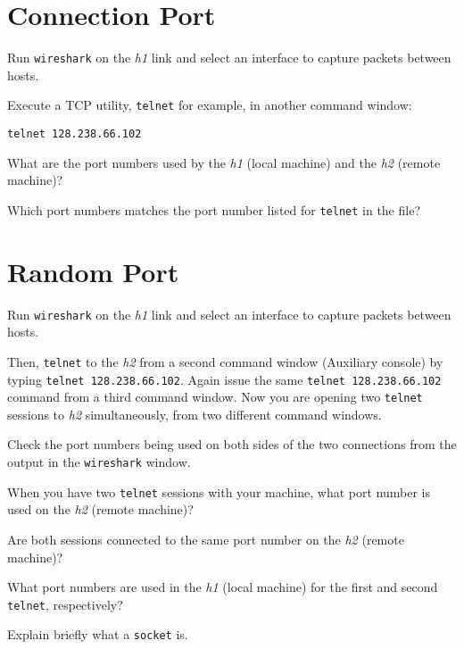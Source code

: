 \documentclass{../UTNetLab}
\begin{document}
\section{Connection Port}
    Run \lstinline{wireshark} on the \textit{h1} link and select an interface to capture packets between hosts.

    Execute a TCP utility, \lstinline{telnet} for example, in another command window:
    \begin{lstlisting}
telnet 128.238.66.102
    \end{lstlisting}
    
    \begin{report}
        \item What are the port numbers used by the \textit{h1} (local machine) and the \textit{h2} (remote machine)?

        \item Which port numbers matches the port number listed for \lstinline{telnet} in the  file?
    \end{report}

\section{Random Port}
    Run \lstinline{wireshark} on the \textit{h1} link and select an interface to capture packets between hosts.

    Then, \lstinline{telnet} to the \textit{h2} from a second command window (Auxiliary console) by typing \lstinline{telnet 128.238.66.102}.
    Again issue the same \lstinline{telnet 128.238.66.102} command from a third command window.
    Now you are opening two \lstinline{telnet} sessions to \textit{h2} simultaneously, from two different command windows.

    Check the port numbers being used on both sides of the two connections from the output in the \lstinline{wireshark} window.

    \begin{report}
        \item When you have two \lstinline{telnet} sessions with your machine, what port number is used on the \textit{h2} (remote machine)?

        \item Are both sessions connected to the same port number on the \textit{h2} (remote machine)?

        \item What port numbers are used in the \textit{h1} (local machine) for the first and second \lstinline{telnet}, respectively?

        \item Explain briefly what a \lstinline[language=bash]{socket} is.
    \end{report}
\end{document}
